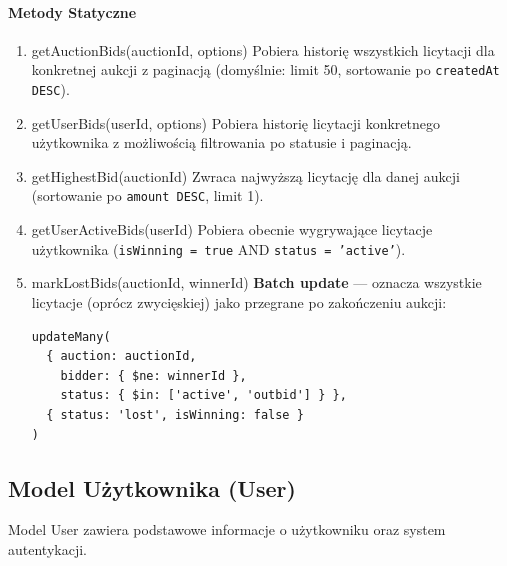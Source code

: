 \paragraph{Metody Statyczne}
\begin{enumerate}
  \item getAuctionBids(auctionId, options)
        Pobiera historię wszystkich licytacji dla konkretnej aukcji z paginacją (domyślnie: limit 50, sortowanie po \texttt{createdAt DESC}).

  \item getUserBids(userId, options)
        Pobiera historię licytacji konkretnego użytkownika z możliwością filtrowania po statusie i paginacją.

  \item getHighestBid(auctionId)
        Zwraca najwyższą licytację dla danej aukcji (sortowanie po \texttt{amount DESC}, limit 1).

  \item getUserActiveBids(userId)
        Pobiera obecnie wygrywające licytacje użytkownika (\texttt{isWinning = true} AND \texttt{status = 'active'}).

  \item markLostBids(auctionId, winnerId)
        \textbf{Batch update} --- oznacza wszystkie licytacje (oprócz zwycięskiej) jako przegrane po zakończeniu aukcji:
        \begin{lstlisting}
updateMany(
  { auction: auctionId,
    bidder: { $ne: winnerId },
    status: { $in: ['active', 'outbid'] } },
  { status: 'lost', isWinning: false }
)
\end{lstlisting}
\end{enumerate}

\subsection{Model Użytkownika (User)}

Model User zawiera podstawowe informacje o użytkowniku oraz system autentykacji.

